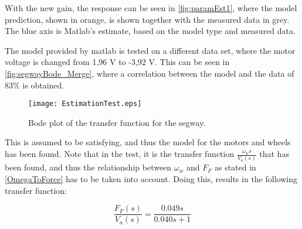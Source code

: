 With the new gain, the response can be seen in \autoref{fig:paramEst1}, where the model prediction, shown in orange, is shown together with the measured data in grey. The blue axis is Matlab's estimate, based on the model type and measured data.

The model provided by matlab is tested on a different data set, where the motor voltage is changed from 1,96 V to -3,92 V. This can be seen in \autoref{fig:segwayBode_Merge}, where a correlation between the model and the data of $83 \% $ is obtained.

\begin{figure}[H]
    \centering
    \texttt{[image: EstimationTest.eps]}
    \caption{Bode plot of the transfer function for the segway.}
    \label{fig:paramEst2}
\end{figure} 

This is assumed to be satisfying, and thus the model for the motors and wheels has been found. Note that in the test, it is the transfer function $\frac{\omega_w{s}}{V_a(s)}$ that has been found, and thus the relationship between $\omega_w$ and $F_F$ as stated in \autoref{OmegaToForce} has to be taken into account. Doing this, results in the following transfer function:

\begin{equation}
\frac{F_F(s)}{V_a(s)} = \frac{0.049s}{0.040s + 1}
\label{eq:motorWheelFinal}
\end{equation}

